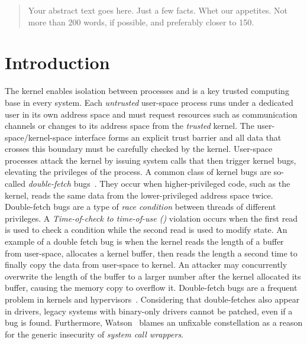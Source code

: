 \documentclass[letterpaper,twocolumn,10pt, anonymous]{article}
\begin{document}
\maketitle

\begin{abstract}
Your abstract text goes here. Just a few facts. Whet our appetites.
Not more than 200 words, if possible, and preferably closer to 150.
\end{abstract}

\section{Introduction}

The kernel enables isolation between processes and is a key trusted computing
base in every system. Each \emph{untrusted} user-space process runs under a
dedicated user in its own address space and must request resources such as
communication channels or changes to its address space from the \emph{trusted}
kernel. The user-space/kernel-space interface forms an explicit trust barrier
and all data that crosses this boundary must be carefully checked by the kernel.
%
User-space processes attack the kernel by issuing system calls that then trigger
kernel bugs, elevating the privileges of the process.
%
A common class of kernel bugs are so-called \emph{double-fetch}
bugs~\cite{serna08doublefetch, twizsgrakky07ring0, wilhelm2016xenpwn,
wang2018survey}. They occur when higher-privileged code, such as
the kernel, reads the same data from the lower-privileged address space twice.
%
Double-fetch bugs are a type of
\emph{race condition} between threads of different privileges. A
\emph{Time-of-check to time-of-use (\tocttou)} violation occurs when the first
read is used to check a condition while the second read is used to modify
state.
%
An example of a double fetch bug is when the kernel reads the length of a buffer
from user-space, allocates a kernel buffer, then reads the length a second time
to finally copy the data from user-space to kernel. An attacker may concurrently
overwrite the length of the buffer to a larger number after the kernel allocated
its buffer, causing the memory copy to overflow it.
%
Double-fetch bugs are a frequent problem in kernels and
hypervisors~\cite{cve201812633, cve202012652, cve20131332, cve201920610,
cve20158550, cve201610439, cve201610435, cve201610433, cve20195519,
cve20168438}. Considering that double-fetches also appear in drivers, legacy
systems with binary-only drivers cannot be patched, even if a bug is found.
Furthermore, Watson~\cite{watson2007exploiting} blames an unfixable \tocttou
constellation as a reason for the generic insecurity of \emph{system call
wrappers}.
\end{document}
